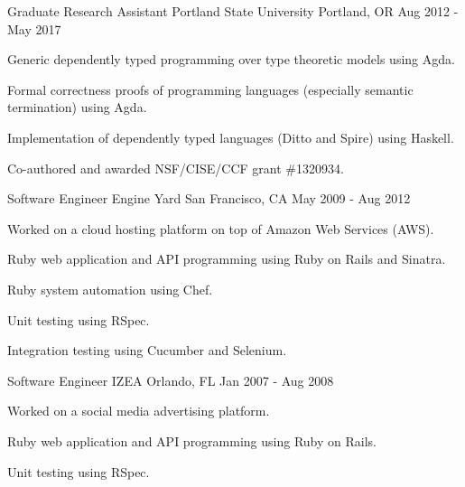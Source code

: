 

\begin{cventries}

  \cventry
    {Graduate Research Assistant} %
    {Portland State University} %
    {Portland, OR} %
    {Aug 2012 - May 2017} %
    {
      \begin{cvitems} %
        \item {Generic dependently typed programming over type theoretic models using Agda.}
        \item {Formal correctness proofs of programming languages (especially semantic termination) using Agda.}
        \item {Implementation of dependently typed languages (Ditto and Spire) using Haskell.}
        \item {Co-authored and awarded NSF/CISE/CCF grant \#1320934.}
      \end{cvitems}
    }

  \cventry
    {Software Engineer} %
    {Engine Yard} %
    {San Francisco, CA} %
    {May 2009 - Aug 2012} %
    {
      \begin{cvitems} %
        \item {Worked on a cloud hosting platform on top of Amazon Web Services (AWS).}
        \item {Ruby web application and API programming using Ruby on Rails and Sinatra.}
        \item {Ruby system automation using Chef.}
        \item {Unit testing using RSpec.}
        \item {Integration testing using Cucumber and Selenium.}
      \end{cvitems}
    }

  \cventry
    {Software Engineer} %
    {IZEA} %
    {Orlando, FL} %
    {Jan 2007 - Aug 2008} %
    {
      \begin{cvitems} %
        \item {Worked on a social media advertising platform.}
        \item {Ruby web application and API programming using Ruby on Rails.}
        \item {Unit testing using RSpec.}
      \end{cvitems}
    }


\end{cventries}
